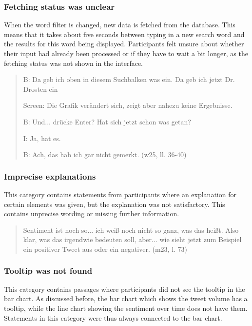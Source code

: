 \subsubsection*{Fetching status was unclear}
When the word filter is changed, new data is fetched from the database. This means that it takes about five seconds between typing in a new search word and the results for this word being displayed. Participants felt unsure about whether their input had already been processed or if they have to wait a bit longer, as the fetching status was not shown in the interface.

\begin{quote}
    B: Da geb ich oben in diesem Suchbalken was ein. Da geb ich jetzt Dr. Drosten ein

    Screen: Die Grafik verändert sich, zeigt aber nahezu keine Ergebnisse. 

    B: Und... drücke Enter? Hat sich jetzt schon was getan?

    I: Ja, hat es.

    B: Ach, das hab ich gar nicht gemerkt. (w25, ll. 36-40)
\end{quote}

\subsubsection*{Imprecise explanations}\label{sec:unprecise_explanations}
This category contains statements from participants where an explanation for certain elements was given, but the explanation was not satisfactory. This contains unprecise wording or missing further information.

\begin{quote}
    Sentiment ist noch so... ich weiß noch nicht so ganz, was das heißt. Also klar, was das irgendwie bedeuten soll, aber... wie sieht jetzt zum Beispiel ein positiver Tweet aus oder ein negativer. (m23, l. 73)
\end{quote}

\subsubsection*{Tooltip was not found}
This category contains passages where participants did not see the tooltip in the bar chart. As discussed before, the bar chart which shows the tweet volume has a tooltip, while the line chart showing the sentiment over time does not have them. Statements in this category were thus always connected to the bar chart.

